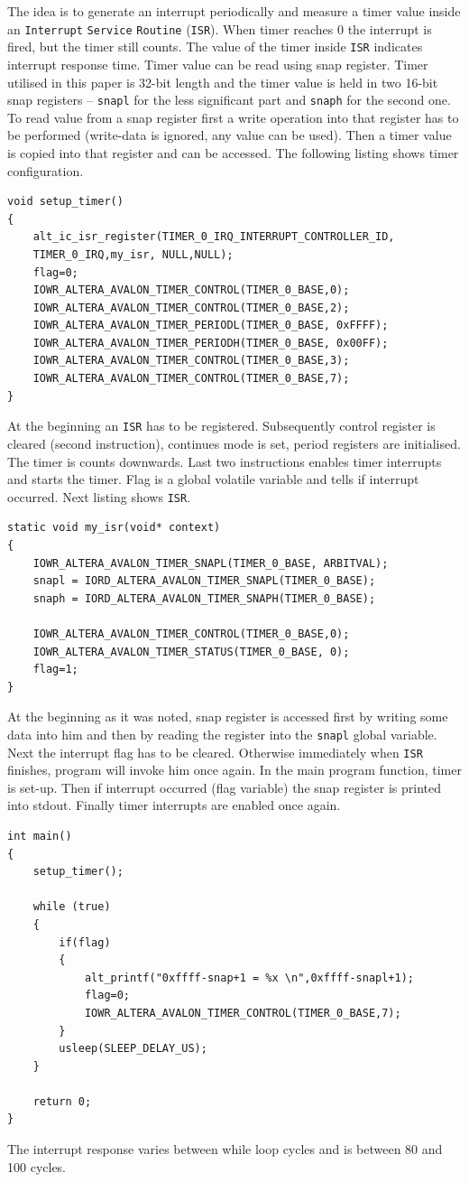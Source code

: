 The idea is to generate an interrupt periodically and measure a timer value inside an \verb|Interrupt| \verb|Service| \verb|Routine| (\verb|ISR|). When timer reaches 0 the interrupt is fired, but the timer still counts. The value of the timer inside \verb|ISR| indicates interrupt response time. Timer value can be read using snap register. Timer utilised in this paper is 32-bit length and the timer value is held in two 16-bit snap registers -- \verb|snapl| for the less significant part and \verb|snaph| for the second one. To read value from a snap register first a write operation into that register has to be performed (write-data is ignored, any value can be used). Then a timer value is copied into that register and can be accessed. The following listing shows timer configuration. 
\begin{lstlisting}[style=customc, frame=none]
void setup_timer()
{
    alt_ic_isr_register(TIMER_0_IRQ_INTERRUPT_CONTROLLER_ID,
    TIMER_0_IRQ,my_isr, NULL,NULL);
    flag=0;
    IOWR_ALTERA_AVALON_TIMER_CONTROL(TIMER_0_BASE,0);
    IOWR_ALTERA_AVALON_TIMER_CONTROL(TIMER_0_BASE,2);
    IOWR_ALTERA_AVALON_TIMER_PERIODL(TIMER_0_BASE, 0xFFFF); 
    IOWR_ALTERA_AVALON_TIMER_PERIODH(TIMER_0_BASE, 0x00FF);
    IOWR_ALTERA_AVALON_TIMER_CONTROL(TIMER_0_BASE,3);
    IOWR_ALTERA_AVALON_TIMER_CONTROL(TIMER_0_BASE,7);
}
\end{lstlisting}
At the beginning an \verb|ISR| has to be registered. Subsequently control register is cleared (second instruction), continues mode is set, period registers are initialised. The timer is counts downwards. Last two instructions enables timer interrupts and starts the timer. Flag is a global volatile variable and tells if interrupt occurred. Next listing shows \verb|ISR|.
\begin{lstlisting}[style=customc, frame=none]
static void my_isr(void* context)
{
    IOWR_ALTERA_AVALON_TIMER_SNAPL(TIMER_0_BASE, ARBITVAL);
    snapl = IORD_ALTERA_AVALON_TIMER_SNAPL(TIMER_0_BASE);
    snaph = IORD_ALTERA_AVALON_TIMER_SNAPH(TIMER_0_BASE);
    
    IOWR_ALTERA_AVALON_TIMER_CONTROL(TIMER_0_BASE,0);
    IOWR_ALTERA_AVALON_TIMER_STATUS(TIMER_0_BASE, 0);
    flag=1;
}
\end{lstlisting}
At the beginning as it was noted, snap register is accessed first by writing some data into him and then by reading the register into the \verb|snapl| global variable. Next the interrupt flag has to be cleared. Otherwise immediately when \verb|ISR| finishes, program will invoke him once again. 
In the main program function, timer is set-up. Then if interrupt occurred (flag variable) the snap register is printed into stdout. Finally timer interrupts are enabled once again.
\begin{lstlisting}[style=customc, frame=none]
int main()
{
    setup_timer();

    while (true)
    {
        if(flag)
        {
            alt_printf("0xffff-snap+1 = %x \n",0xffff-snapl+1);
            flag=0;
            IOWR_ALTERA_AVALON_TIMER_CONTROL(TIMER_0_BASE,7); 
        }
        usleep(SLEEP_DELAY_US);
    }
    
    return 0;
}
\end{lstlisting}
The interrupt response varies between while loop cycles and is between 80 and 100 cycles.